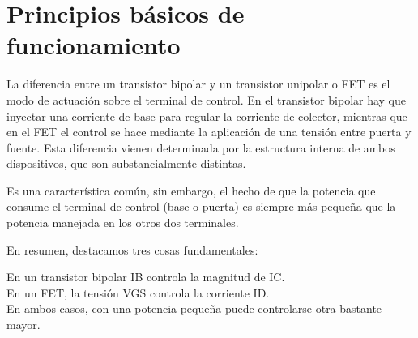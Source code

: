 \documentclass[10pt,letterpaper]{article}
\begin{document}
\section{Principios básicos de funcionamiento}
La diferencia entre un transistor bipolar y un transistor unipolar o FET es el modo de actuación sobre el terminal de control. En el transistor bipolar hay que inyectar una corriente de base para regular la corriente de colector, mientras que en el FET el control se hace mediante la aplicación de una tensión entre puerta y fuente. Esta diferencia vienen determinada por la estructura interna de ambos dispositivos, que son substancialmente distintas.

Es una característica común, sin embargo, el hecho de que la potencia que consume el terminal de control (base o puerta) es siempre más pequeña que la potencia manejada en los otros dos terminales.

En resumen, destacamos tres cosas fundamentales:

En un transistor bipolar IB controla la magnitud de IC.\\
En un FET, la tensión VGS controla la corriente ID.\\
En ambos casos, con una potencia pequeña puede controlarse otra bastante mayor.\\
\newpage
\end{document}
